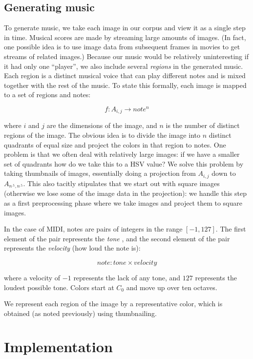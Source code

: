\documentclass[10pt, conference, compsocconf]{IEEEtran}
\begin{document}
\subsection{Generating music}
\label{sec:generating}

To generate music, we take each image in our corpus and view it as a
single step in time.  Musical scores are made by streaming large
amounts of images.  (In fact, one possible idea is to use image data
from subsequent frames in movies to get streams of related images.)
Because our music would be relatively uninteresting if it had only one
``player'', we also include several \emph{regions} in the generated
music.  Each region is a distinct musical voice that can play
different notes and is mixed together with the rest of the music.  To
state this formally, each image is mapped to a set of regions and
notes:

\[
    f : A_{i,j} \to note^n
\]

where $i$ and $j$ are the dimensions of the image, and $n$ is the
number of distinct regions of the image.  The obvious idea is to
divide the image into $n$ distinct quadrants of equal size and project
the colors in that region to notes.  One problem is that we often deal
with relatively large images: if we have a smaller set of quadrants
how do we take this to a HSV value?  We solve this problem by taking
thumbnails of images, essentially doing a projection from $A_{i,j}$
down to $A_{n^{.5},n^{.5}}$.  This also tacitly stipulates that we
start out with square images (otherwise we lose some of the image data
in the projection): we handle this step as a first preprocessing phase
where we take images and project them to square images.

In the case of MIDI, notes are pairs of integers in the range
$[-1,127]$.  The first element of the pair represents the \emph{tone}
, and the second element of the pair represents the \emph{velocity}
(how loud the note is):

\[
    note : tone \times velocity
\]

where a velocity of $-1$ represents the lack of any tone, and $127$
represents the loudest possible tone.  Colors start at $C_0$ and move
up over ten octaves.

We represent each region of the image by a representative color, which
is obtained (as noted previously) using thumbnailing.


\section{Implementation}
\end{document}
